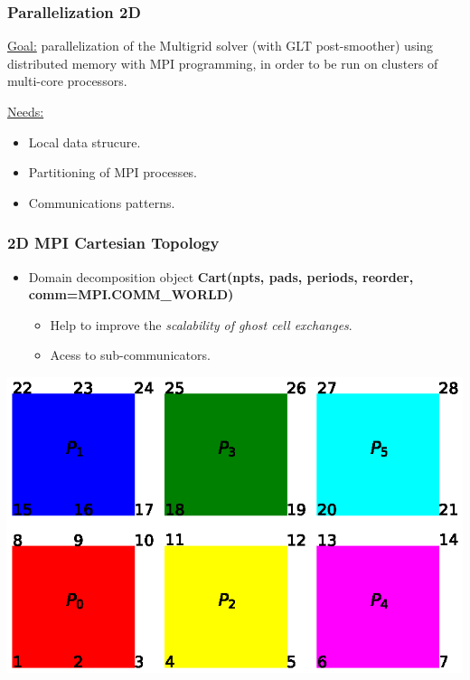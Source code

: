 \begin{frame}
\frametitle{Parallelization 2D}
\underline{Goal:} parallelization of the Multigrid solver (with GLT post-smoother) using distributed memory with MPI
programming, in order to be run on clusters of multi-core processors.

 \vspace{0.5cm}
\underline{Needs:}
\begin{itemize}
	\item Local data strucure.
	\item Partitioning of MPI processes.
	\item Communications patterns.
\end{itemize}

\end{frame}

\begin{frame}
\frametitle{2D MPI Cartesian Topology}

\begin{itemize}

  \item Domain decomposition object
    \vskip 0.1cm
\textbf{ \footnotesize
 Cart(npts, pads, periods, reorder, comm=MPI.COMM\_WORLD)}
    \vskip 0.2cm
\begin{itemize}

\item [\ding{224}] Help to improve the \emph{scalability of ghost cell exchanges}.
\item [\ding{224}] Acess to sub-communicators.
\end{itemize}

\end{itemize}

  \begin{center}
    \includegraphics[angle=0,width=0.9\hsize]{figures/mpi_topology}
  \end{center}
  

\end{frame}

